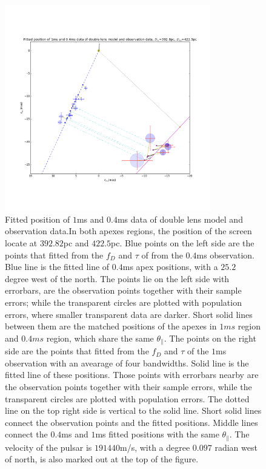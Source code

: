 \documentclass[useAMS,usenatbib]{mn2e}
\begin{document}
\begin{figure}
\centering
\includegraphics[width=0.8\textwidth, angle=0]{Double_lens_640.png}
\caption{Fitted position of $1$ms and $0.4$ms data of double lens model and observation data.In both apexes regions, the position of the screen locate at $392.82$pc and $422.5$pc. Blue points on the left side are the points that fitted from the $f_D$ and $\tau$ of from the $0.4$ms observation. Blue line is the fitted line of $0.4$ms apex positions, with a $25.2$ degree west of the north. The points lie on the left side with errorbars, are the observation points together with their sample errors; while the transparent circles are plotted with population errors, where smaller transparent data are darker. Short solid lines between them are the matched positions of the apexes in $1ms$ region and $0.4ms$ region, which share the same $\theta_{\parallel}$. The points on the right side are the points that fitted from the $f_D$ and $\tau$ of the $1$ms observation with an avearage of four bandwidths. Solid line is the fitted line of these positions. Those points with errorbars nearby are the observation points together with their sample errors, while the transparent circles are plotted with population errors. The dotted line on the top right side is vertical to the solid line. Short solid lines connect the observation points and the fitted positions. Middle lines connect the $0.4$ms and $1$ms fitted positions with the same $\theta_{\parallel}$. The velocity of the pulsar is $191440$m/s, with a degree $0.097$ radian west of north, is also marked out at the top of the figure.  }
\label{Doublelens}
\end{figure}
\end{document}
